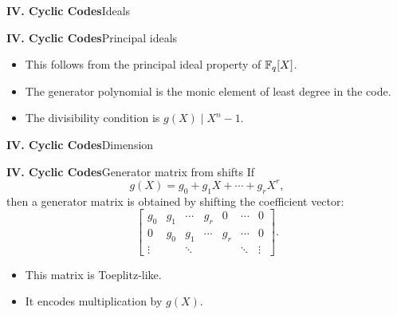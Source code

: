 \begin{frame}{\textbf{IV. Cyclic Codes}}{Ideals}
\small
{}
\end{frame}

\begin{frame}{\textbf{IV. Cyclic Codes}}{Principal ideals}
\small
{}
\begin{itemize}
  \item This follows from the principal ideal property of $\mathbb{F}_q[X]$.
  \item The generator polynomial is the monic element of least degree in the code.
  \item The divisibility condition is $g(X)\mid X^n-1$.
\end{itemize}
\end{frame}

\begin{frame}{\textbf{IV. Cyclic Codes}}{Dimension}
\small
{}
\end{frame}

\begin{frame}{\textbf{IV. Cyclic Codes}}{Generator matrix from shifts}
\small
If
\[
  g(X)=g_0+g_1X+\cdots+g_rX^r,
\]
then a generator matrix is obtained by shifting the coefficient vector:
\[
\begin{bmatrix}
g_0&g_1&\cdots&g_r&0&\cdots&0\\
0&g_0&g_1&\cdots&g_r&\cdots&0\\
\vdots&&\ddots&&&\ddots&\vdots
\end{bmatrix}.
\]
\begin{itemize}
  \item This matrix is Toeplitz-like.
  \item It encodes multiplication by $g(X)$.
\end{itemize}
\end{frame}


